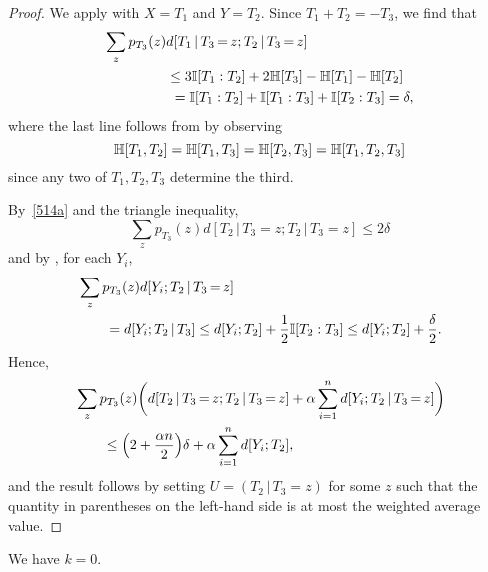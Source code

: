 \begin{proof}
  We apply  with $X=T_1$ and $Y=T_2$.
  Since $T_1+T_2=-T_3$, we find that
  \begin{align}\nonumber
    \sum_{z} p_{T_3}(z) & d[T_1 \,|\, T_3 \mathop{=} z;T_2 \,|\, T_3 \mathop{=} z] \\ \nonumber
    &\leq  3 \mathbb{I}[T_1 : T_2] + 2 \mathbb{H}[T_3] - \mathbb{H}[T_1] - \mathbb{H}[T_2] \\
    &\ = \mathbb{I}[T_1 : T_2] + \mathbb{I}[T_1 : T_3] + \mathbb{I}[T_2 : T_3]
    = \delta,\label{514a}
  \end{align}
  where the last line follows from  by observing
  \[
    \mathbb{H}[T_1,T_2] = \mathbb{H}[T_1,T_3] = \mathbb{H}[T_2,T_3] = \mathbb{H}[T_1,T_2,T_3]
  \]
  since any two of $T_1,T_2,T_3$ determine the third.

  By~\eqref{514a} and the triangle inequality,
  \[
    \sum_z p_{T_3}(z) d[T_2 \,|\, T_3 \mathop{=} z; T_2 \,|\, T_3\mathop{=}z] \leq 2 \delta
  \]
  and by , for each $Y_i$,
  \begin{align*}
    &\sum_z p_{T_3}(z) d[Y_i; T_2 \,|\, T_3 \mathop{=} z] \\
    &\qquad= d[Y_i; T_2 \,|\, T_3]
                                    \leq d[Y_i;T_2] + \frac12 \mathbb{I}[T_2 : T_3]
                                    \leq d[Y_i;T_2] + \frac{\delta}{2}.
  \end{align*}
  Hence,
  \begin{align*}
    &\sum_z p_{T_3}(z) \bigg( d[T_2 \,|\, T_3 \mathop{=} z; T_2 \,|\, T_3 \mathop{=} z] + \alpha \sum_{i=1}^n d[Y_i;T_2 \,|\, T_3 \mathop{=} z] \bigg) \\
    &\qquad \leq
    \Bigl(2 + \frac{\alpha n}{2} \Bigr) \delta + \alpha \sum_{i=1}^n d[Y_i; T_2],
  \end{align*}
  and the result follows by setting $U=(T_2 \,|\, T_3 \mathop{=} z)$ for some $z$ such that the quantity in parentheses on the left-hand side is at most the weighted average value.
\end{proof}

\begin{proposition}\label{k-vanish}\leanok  We have $k = 0$.
\end{proposition}

